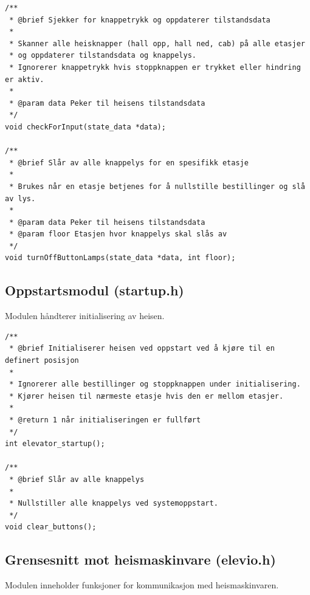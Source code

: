 \begin{lstlisting}[style=cpp, caption=Hovedfunksjoner i inputmodulen]
/**
 * @brief Sjekker for knappetrykk og oppdaterer tilstandsdata
 * 
 * Skanner alle heisknapper (hall opp, hall ned, cab) på alle etasjer
 * og oppdaterer tilstandsdata og knappelys.
 * Ignorerer knappetrykk hvis stoppknappen er trykket eller hindring er aktiv.
 * 
 * @param data Peker til heisens tilstandsdata
 */
void checkForInput(state_data *data);

/**
 * @brief Slår av alle knappelys for en spesifikk etasje
 * 
 * Brukes når en etasje betjenes for å nullstille bestillinger og slå av lys.
 * 
 * @param data Peker til heisens tilstandsdata
 * @param floor Etasjen hvor knappelys skal slås av
 */
void turnOffButtonLamps(state_data *data, int floor);
\end{lstlisting}

\subsection{Oppstartsmodul (startup.h)}
Modulen håndterer initialisering av heisen.

\begin{lstlisting}[style=cpp, caption=Hovedfunksjoner i oppstartsmodulen]
/**
 * @brief Initialiserer heisen ved oppstart ved å kjøre til en definert posisjon
 * 
 * Ignorerer alle bestillinger og stoppknappen under initialisering.
 * Kjører heisen til nærmeste etasje hvis den er mellom etasjer.
 * 
 * @return 1 når initialiseringen er fullført
 */
int elevator_startup();

/**
 * @brief Slår av alle knappelys
 * 
 * Nullstiller alle knappelys ved systemoppstart.
 */
void clear_buttons();
\end{lstlisting}

\subsection{Grensesnitt mot heismaskinvare (elevio.h)}
Modulen inneholder funksjoner for kommunikasjon med heismaskinvaren.

